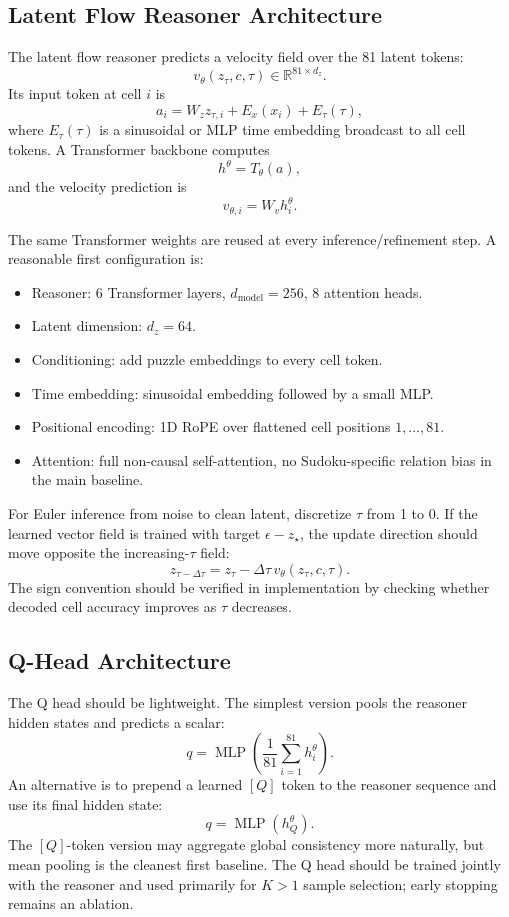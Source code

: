 \documentclass[11pt]{article}
\begin{document}
\subsection{Latent Flow Reasoner Architecture}

The latent flow reasoner predicts a velocity field over the 81 latent tokens:
\[
    v_\theta(z_\tau,c,\tau)\in\mathbb R^{81\times d_z}.
\]
Its input token at cell \(i\) is
\[
    a_i
    =
    W_z z_{\tau,i}
    +
    E_x(x_i)
    +
    E_\tau(\tau),
\]
where \(E_\tau(\tau)\) is a sinusoidal or MLP time embedding broadcast to all cell tokens. A Transformer backbone computes
\[
    h^\theta
    =
    T_\theta(a),
\]
and the velocity prediction is
\[
    v_{\theta,i}=W_v h_i^\theta.
\]

The same Transformer weights are reused at every inference/refinement step. A reasonable first configuration is:
\begin{itemize}[itemsep=0pt]
    \item Reasoner: 6 Transformer layers, \(d_{\mathrm{model}}=256\), 8 attention heads.
    \item Latent dimension: \(d_z=64\).
    \item Conditioning: add puzzle embeddings to every cell token.
    \item Time embedding: sinusoidal embedding followed by a small MLP.
    \item Positional encoding: 1D RoPE over flattened cell positions \(1,\dots,81\).
    \item Attention: full non-causal self-attention, no Sudoku-specific relation bias in the main baseline.
\end{itemize}

For Euler inference from noise to clean latent, discretize \(\tau\) from 1 to 0. If the learned vector field is trained with target \(\epsilon-z_\star\), the update direction should move opposite the increasing-\(\tau\) field:
\[
    z_{\tau-\Delta\tau}
    =
    z_\tau
    -
    \Delta\tau\,v_\theta(z_\tau,c,\tau).
\]
The sign convention should be verified in implementation by checking whether decoded cell accuracy improves as \(\tau\) decreases.

\subsection{Q-Head Architecture}

The Q head should be lightweight. The simplest version pools the reasoner hidden states and predicts a scalar:
\[
    q = \operatorname{MLP}\left(\frac{1}{81}\sum_{i=1}^{81}h_i^\theta\right).
\]
An alternative is to prepend a learned \([Q]\) token to the reasoner sequence and use its final hidden state:
\[
    q = \operatorname{MLP}(h_Q^\theta).
\]
The \([Q]\)-token version may aggregate global consistency more naturally, but mean pooling is the cleanest first baseline. The Q head should be trained jointly with the reasoner and used primarily for \(K>1\) sample selection; early stopping remains an ablation.
\end{document}
